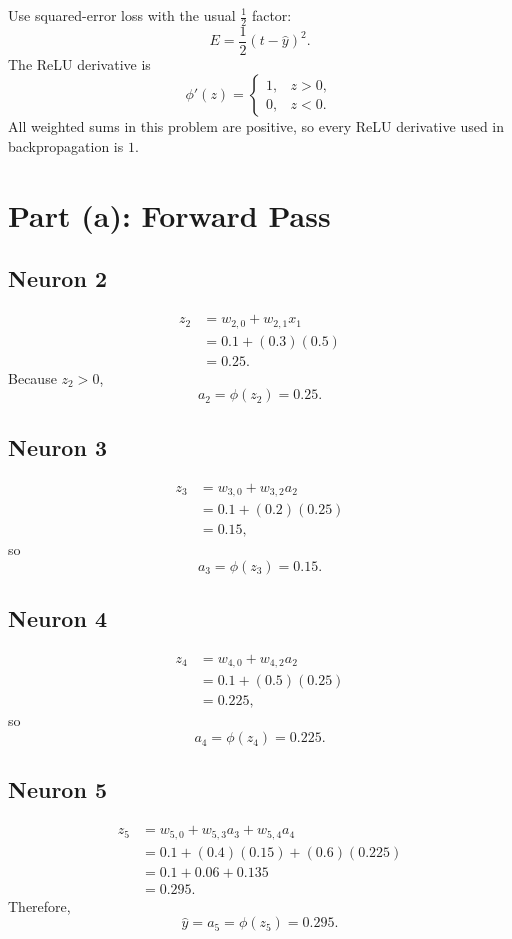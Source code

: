 \documentclass[11pt]{article}
\begin{document}
Use squared-error loss with the usual \(\tfrac12\) factor:
\[
    E = \frac12(t-\hat{y})^2.
\]
The ReLU derivative is
\[
    \phi'(z)
    =
    \begin{cases}
        1, & z>0,\\
        0, & z<0.
    \end{cases}
\]
All weighted sums in this problem are positive, so every ReLU derivative used in
backpropagation is \(1\).

\section*{Part (a): Forward Pass}

\subsection*{Neuron 2}
\[
\begin{aligned}
    z_2 &= w_{2,0}+w_{2,1}x_1 \\
        &= 0.1+(0.3)(0.5) \\
        &= 0.25.
\end{aligned}
\]
Because \(z_2>0\),
\[
    a_2=\phi(z_2)=0.25.
\]

\subsection*{Neuron 3}
\[
\begin{aligned}
    z_3 &= w_{3,0}+w_{3,2}a_2 \\
        &= 0.1+(0.2)(0.25) \\
        &= 0.15,
\end{aligned}
\]
so
\[
    a_3=\phi(z_3)=0.15.
\]

\subsection*{Neuron 4}
\[
\begin{aligned}
    z_4 &= w_{4,0}+w_{4,2}a_2 \\
        &= 0.1+(0.5)(0.25) \\
        &= 0.225,
\end{aligned}
\]
so
\[
    a_4=\phi(z_4)=0.225.
\]

\subsection*{Neuron 5}
\[
\begin{aligned}
    z_5
    &=
    w_{5,0}+w_{5,3}a_3+w_{5,4}a_4 \\
    &=
    0.1+(0.4)(0.15)+(0.6)(0.225) \\
    &=
    0.1+0.06+0.135 \\
    &=
    0.295.
\end{aligned}
\]
Therefore,
\[
    \hat{y}=a_5=\phi(z_5)=0.295.
\]
\end{document}
